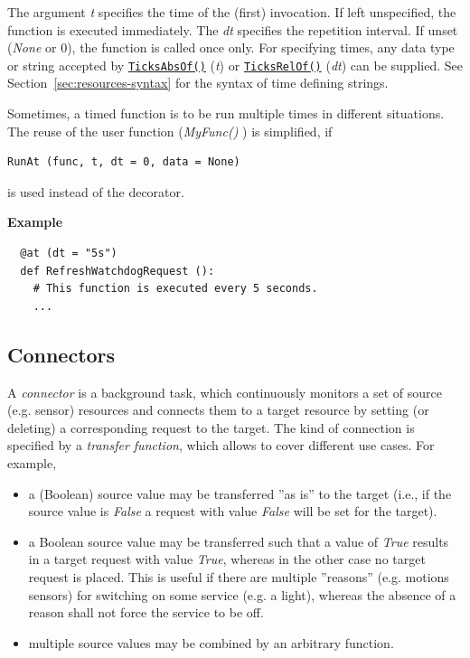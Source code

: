 \documentclass[12pt,english,parskip=half,headheight=19pt]{scrreprt}
\newcommand{\refapipython}[1]{\href{home2l-api_python/index.html}{\mbox{\texttt{#1}}}}  %
\begin{document}
The argument \textit{t} specifies the time of the (first) invocation. If left unspecified, the function is executed immediately. The \textit{dt} specifies the repetition interval. If unset (\textit{None} or 0), the function is called once only. For specifying times, any data type or string accepted by \refapipython{TicksAbsOf()} (\textit{t}) or \refapipython{TicksRelOf()} (\textit{dt}) can be supplied. See Section~\ref{sec:resources-syntax} for the syntax of time defining strings.

Sometimes, a timed function is to be run multiple times in different situations. The reuse of the user function (\textit{MyFunc()} ) is simplified, if
\begin{lstlisting}
RunAt (func, t, dt = 0, data = None)
\end{lstlisting}
is used instead of the decorator.

\textbf{Example}
\begin{lstlisting}
  @at (dt = "5s")
  def RefreshWatchdogRequest ():
    # This function is executed every 5 seconds.
    ...
\end{lstlisting}



\subsection{Connectors}
\label{sec:rules-actions-connectors}

A \textit{connector} is a background task, which continuously monitors a set of source (e.g. sensor) resources  and connects them to a target resource by setting (or deleting) a corresponding request to the target. The kind of connection is specified by a \textit{transfer function}, which allows to cover different use cases. For example,
\begin{itemize}
  \item a (Boolean) source value may be transferred ''as is'' to the target (i.e., if the
    source value is \textit{False} a request with value \textit{False} will be set for the
    target).
  \item a Boolean source value may be transferred such that a value of \textit{True} results in
    a target request with value \textit{True}, whereas in the other case no target request is
    placed. This is useful if there are multiple ''reasons'' (e.g. motions sensors) for
    switching on some service (e.g. a light), whereas the absence of a reason shall not force
    the service to be off.
  \item multiple source values may be combined by an arbitrary function.
\end{itemize}
\end{document}
